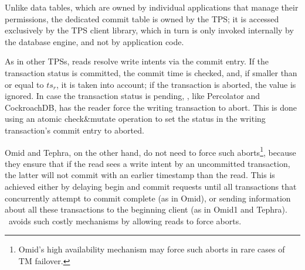 Unlike data tables, which are owned by individual applications that manage their permissions,  
the dedicated commit table is owned by the TPS; it is accessed exclusively by the 
TPS client library, which in turn is only invoked   internally by the database engine, and not by application code. 

As in other TPSs, reads resolve write intents via the commit entry.
If the transaction status is committed, the commit time is checked, and, if smaller than or equal to $ts_r$, it is taken into account;
if the transaction is aborted, the value is ignored.
In case the transaction status is pending, \sys, like Percolator and CockroachDB, has the reader
force the writing transaction to abort. This is done using an atomic check\&mutate operation to set the status in the
writing transaction's commit entry to aborted.

Omid and Tephra, on the other hand, do not need to force such aborts\footnote{Omid's high availability mechanism  
may force such aborts in rare cases of TM failover.}, because they ensure that  if the read sees a write intent
by an uncommitted transaction, the latter will not commit with an earlier timestamp than the read.
This is achieved  
either by delaying begin and commit requests until all transactions that concurrently attempt to commit complete (as in Omid),
or sending information about all these transactions to the beginning client (as in Omid1 and Tephra).
\sysll\ avoids such costly mechanisms by allowing reads to force aborts. 



 